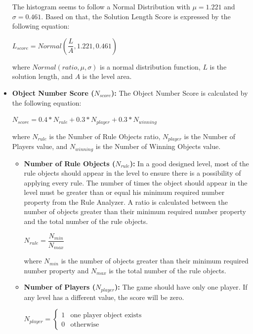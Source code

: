 \begin{itemize}
	
	The histogram seems to follow a Normal Distribution with $\mu = 1.221$ and $\sigma = 0.461$. Based on that, the Solution Length Score is expressed by the following equation:
	\begin{center}$L_{score} = Normal(\dfrac{L}{A}, 1.221, 0.461)$\end{center}
	where $Normal(ratio, \mu, \sigma)$ is a normal distribution function, $L$ is the solution length, and $A$ is the level area.
	
	\item \textbf{Object Number Score ($N_{score}$):} The Object Number Score is calculated by the following equation:
	\begin{center}$N_{score} = 0.4 * N_{rule} + 0.3 * N_{player} + 0.3 * N_{winning}$\end{center}
	where $N_{rule}$ is the Number of Rule Objects ratio, $N_{player}$ is the Number of Players value, and $N_{winning}$ is the Number of Winning Objects value.
	\begin{itemize}
		\item \textbf{Number of Rule Objects ($N_{rule}$):} In a good designed level, most of the rule objects should appear in the level to ensure there is a possibility of applying every rule. The number of times the object should appear in the level must be greater than or equal his minimum required number property from the Rule Analyzer. A ratio is calculated between the number of objects greater than their minimum required number property and the total number of the rule objects.
		\begin{center}$N_{rule} = \dfrac{N_{min}}{N_{max}}$\end{center}
		where $N_{min}$ is the number of objects greater than their minimum required number property and $N_{max}$ is the total number of the rule objects.
		\item \textbf{Number of Players ($N_{player}$):} The game should have only one player. If any level has a different value, the score will be zero.
		\begin{center}
		$N_{player}= \begin{cases}
		               1 & \text{one player object exists}\\
		               0 & \text{otherwise}
		           \end{cases}$
		\end{center}

\end{itemize}
\end{itemize}
